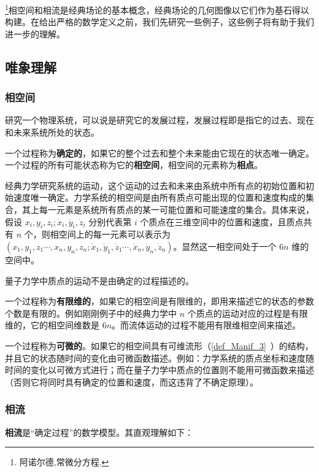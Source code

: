 
\begin{issues}
\end{issues}

\footnote{阿诺尔德,常微分方程.}相空间和相流是经典场论的基本概念，经典场论的几何图像以它们作为基石得以构建。在给出严格的数学定义之前，我们先研究一些例子，这些例子将有助于我们进一步的理解。
\subsection{唯象理解}
\subsubsection{相空间}
研究一个物理系统，可以说是研究它的发展过程，发展过程即是指它的过去、现在和未来系统所处的状态。

一个过程称为\textbf{确定的}，如果它的整个过去和整个未来能由它现在的状态唯一确定。一个过程的所有可能状态称为它的\textbf{相空间}，相空间的元素称为\textbf{相点}。

\begin{example}{}
经典力学研究系统的运动，这个运动的过去和未来由系统中所有点的初始位置和初始速度唯一确定。力学系统的相空间是由所有质点可能出现的位置和速度构成的集合，其上每一元素是系统所有质点的某一可能位置和可能速度的集合。具体来说，假设 $x_{i},y_i,z_i;\dot{x}_i,\dot{y}_i,\dot z_i$ 分别代表第 $i$ 个质点在三维空间中的位置和速度，且质点共有 $n$ 个，则相空间上的每一元素可以表示为 $(x_1,y_1,z_1\cdots,x_n,y_n,z_n;\dot x _1,\dot y_1,\dot z_1\cdots,\dot x_n,\dot y_n,\dot z_n)$。显然这一相空间处于一个 $6n$ 维的空间中。

量子力学中质点的运动不是由确定的过程描述的。
\end{example}

一个过程称为\textbf{有限维的}，如果它的相空间是有限维的，即用来描述它的状态的参数个数是有限的。例如刚刚例子中的经典力学中 $n$ 个质点的运动对应的过程是有限维的，它的相空间维数是 $6n$。而流体运动的过程不能用有限维相空间来描述。

一个过程称为\textbf{可微的}。如果它的相空间具有可维流形（\autoref{def_Manif_3}~）的结构，并且它的状态随时间的变化由可微函数描述。例如：力学系统的质点坐标和速度随时间的变化以可微方式进行；而在量子力学中质点的位置则不能用可微函数来描述（否则它将同时具有确定的位置和速度，而这违背了不确定原理）。
\subsubsection{相流}
\textbf{相流}是“确定过程”的数学模型。其直观理解如下：

